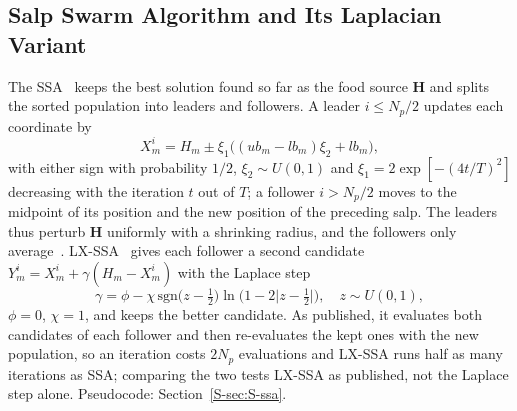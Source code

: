 
\subsection{Salp Swarm Algorithm and Its Laplacian Variant}
\label{sec:ssa}
The SSA~\cite{Mirjalili2017} keeps the best solution found so far as the food source $\mathbf H$ and splits the sorted population into leaders and followers. A leader $i\le N_p/2$ updates each coordinate by
\begin{equation}\label{eq:leader}
X_m^i = H_m\pm\xi_1\big((ub_m-lb_m)\xi_2+lb_m\big),
\end{equation}
with either sign with probability $1/2$, $\xi_2\sim U(0,1)$ and $\xi_1=2\exp[-(4t/T)^2]$ decreasing with the iteration $t$ out of $T$; a follower $i>N_p/2$ moves to the midpoint of its position and the new position of the preceding salp. The leaders thus perturb $\mathbf H$ uniformly with a shrinking radius, and the followers only average~\cite{Castelli2022}. LX-SSA~\cite{Solanki2023} gives each follower a second candidate $Y_m^i=X_m^i+\gamma(H_m-X_m^i)$ with the Laplace step~\cite{Deep2007}
\begin{equation}
\gamma=\phi-\chi\,\mathrm{sgn}\bigl(z-\tfrac12\bigr)\ln\bigl(1-2\lvert z-\tfrac12\rvert\bigr),\quad z\sim U(0,1),
\label{eq:laplace}
\end{equation}
$\phi=0$, $\chi=1$, and keeps the better candidate. As published, it evaluates both candidates of each follower and then re-evaluates the kept ones with the new population, so an iteration costs $2N_p$ evaluations and LX-SSA runs half as many iterations as SSA; comparing the two tests LX-SSA as published, not the Laplace step alone. Pseudocode: Section~\ref{S-sec:S-ssa}.

